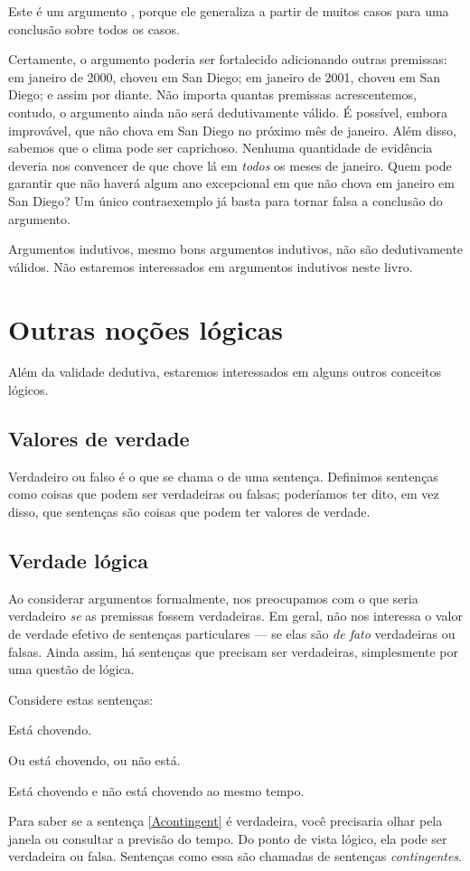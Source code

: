 Este é um argumento , porque ele generaliza a partir de muitos casos para uma conclusão sobre todos os casos.

Certamente, o argumento poderia ser fortalecido adicionando outras premissas: em janeiro de 2000, choveu em San Diego; em janeiro de 2001, choveu em San Diego; e assim por diante. Não importa quantas premissas acrescentemos, contudo, o argumento ainda não será dedutivamente válido. É possível, embora improvável, que não chova em San Diego no próximo mês de janeiro. Além disso, sabemos que o clima pode ser caprichoso. Nenhuma quantidade de evidência deveria nos convencer de que chove lá em \emph{todos} os meses de janeiro. Quem pode garantir que não haverá algum ano excepcional em que não chova em janeiro em San Diego? Um único contraexemplo já basta para tornar falsa a conclusão do argumento.

Argumentos indutivos, mesmo bons argumentos indutivos, não são dedutivamente válidos. Não estaremos interessados em argumentos indutivos neste livro.

\section{Outras noções lógicas}

Além da validade dedutiva, estaremos interessados em alguns outros conceitos lógicos.

\subsection{Valores de verdade}
Verdadeiro ou falso é o que se chama o  de uma sentença. Definimos sentenças como coisas que podem ser verdadeiras ou falsas; poderíamos ter dito, em vez disso, que sentenças são coisas que podem ter valores de verdade.

\subsection{Verdade lógica}

Ao considerar argumentos formalmente, nos preocupamos com o que seria verdadeiro \emph{se} as premissas fossem verdadeiras. Em geral, não nos interessa o valor de verdade efetivo de sentenças particulares — se elas são \emph{de fato} verdadeiras ou falsas. Ainda assim, há sentenças que precisam ser verdadeiras, simplesmente por uma questão de lógica.

Considere estas sentenças:
\begin{earg}
\item[\ex{Acontingent}] Está chovendo.
\item[\ex{Atautology}] Ou está chovendo, ou não está.
\item[\ex{Acontradiction}] Está chovendo e não está chovendo ao mesmo tempo.
\end{earg}
Para saber se a sentença \ref{Acontingent} é verdadeira, você precisaria olhar pela janela ou consultar a previsão do tempo. Do ponto de vista lógico, ela pode ser verdadeira ou falsa. Sentenças como essa são chamadas de sentenças \emph{contingentes}.

